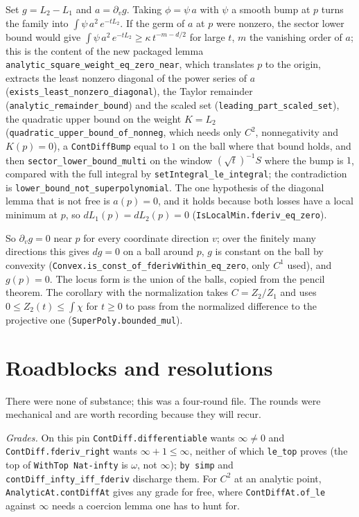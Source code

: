 \documentclass[11pt]{article}
\newcommand{\code}[1]{\texttt{#1}}
\begin{document}
Set $g = L_2 - L_1$ and $a = \partial_v g$. Taking $\phi = \psi\, a$
with $\psi$ a smooth bump at $p$ turns the family into $\int\psi\,
a^2\, e^{-tL_2}$. If the germ of $a$ at $p$ were nonzero, the sector
lower bound would give $\int\psi\, a^2\, e^{-tL_2} \geq \kappa\,
t^{-m-d/2}$ for large $t$, $m$ the vanishing order of $a$; this is the
content of the new packaged lemma
\code{analytic\_square\_weight\_eq\_zero\_near}, which translates $p$ to
the origin, extracts the least nonzero diagonal of the power series of
$a$ (\code{exists\_least\_nonzero\_diagonal}), the Taylor remainder
(\code{analytic\_remainder\_bound}) and the scaled set
(\code{leading\_part\_scaled\_set}), the quadratic upper bound on the
weight $K = L_2$ (\code{quadratic\_upper\_bound\_of\_nonneg}, which needs
only $C^2$, nonnegativity and $K(p) = 0$), a \code{ContDiffBump} equal
to $1$ on the ball where that bound holds, and then
\code{sector\_lower\_bound\_multi} on the window $(\sqrt t)^{-1} S$ where
the bump is $1$, compared with the full integral by
\code{setIntegral\_le\_integral}; the contradiction is
\code{lower\_bound\_not\_superpolynomial}. The one hypothesis of the
diagonal lemma that is not free is $a(p) = 0$, and it holds because
both losses have a local minimum at $p$, so $dL_1(p) = dL_2(p) = 0$
(\code{IsLocalMin.fderiv\_eq\_zero}).

So $\partial_v g = 0$ near $p$ for every coordinate direction $v$; over
the finitely many directions this gives $dg = 0$ on a ball around $p$,
$g$ is constant on the ball by convexity
(\code{Convex.is\_const\_of\_fderivWithin\_eq\_zero}, only $C^1$ used), and
$g(p) = 0$. The locus form is the union of the balls, copied from the
pencil theorem. The corollary with the normalization takes $C = Z_2/Z_1$
and uses $0 \le Z_2(t) \le \int\chi$ for $t \ge 0$ to pass from the
normalized difference to the projective one (\code{SuperPoly.bounded\_mul}).

\section{Roadblocks and resolutions}

There were none of substance; this was a four-round file. The rounds
were mechanical and are worth recording because they will recur.

\emph{Grades.} On this pin \code{ContDiff.differentiable} wants
$\infty \ne 0$ and \code{ContDiff.fderiv\_right} wants $\infty + 1 \le
\infty$, neither of which \code{le\_top} proves (the top of
\code{WithTop Nat-infty} is $\omega$, not $\infty$); \code{by simp} and
\code{contDiff\_infty\_iff\_fderiv} discharge them. For $C^2$ at an
analytic point, \code{AnalyticAt.contDiffAt} gives any grade for free,
where \code{ContDiffAt.of\_le} against $\infty$ needs a coercion lemma
one has to hunt for.
\end{document}
